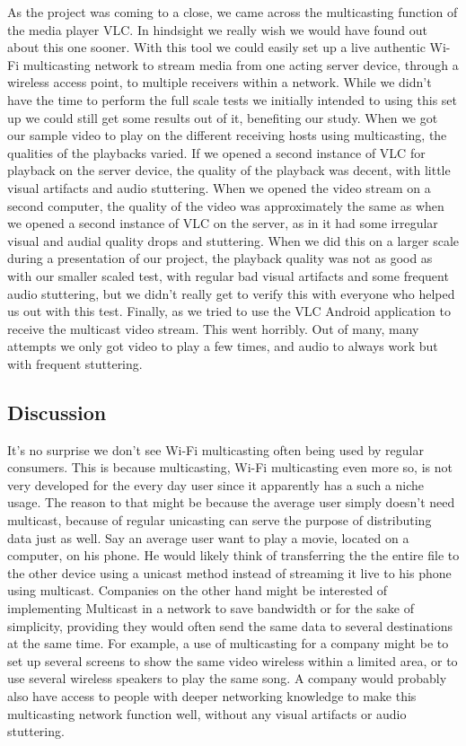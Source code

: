 \documentclass[9pt,a4paper]{acmproc}
\begin{document}
As the project was coming to a close, we came across the multicasting function of the media player VLC. In hindsight we really wish we would have found out about this one sooner. With this tool we could easily set up a live authentic Wi-Fi multicasting network to stream media from one acting server device, through a wireless access point, to multiple receivers within a network. While we didn't have the time to perform the full scale tests we initially intended to using this set up we could still get some results out of it, benefiting our study.
When we got our sample video to play on the different receiving hosts using multicasting, the qualities of the playbacks varied. If we opened a second instance of VLC for playback on the server device, the quality of the playback was decent, with little visual artifacts and audio stuttering. When we opened the video stream on a second computer, the quality of the video was approximately the same as when we opened a second instance of VLC on the server, as in it had some irregular visual and audial quality drops and stuttering. When we did this on a larger scale during a presentation of our project, the playback quality was not as good as with our smaller scaled test, with regular bad visual artifacts and some frequent audio stuttering, but we didn't really get to verify this with everyone who helped us out with this test. Finally, as we tried to use the VLC Android application to receive the multicast video stream. This went horribly. Out of many, many attempts we only got video to play a few times, and audio to always work but with frequent stuttering.

\subsection{Discussion}
It's no surprise we don't see Wi-Fi multicasting often being used by regular consumers. This is because multicasting, Wi-Fi multicasting even more so, is not very developed for the every day user since it apparently has a such a niche usage. The reason to that might be because the average user simply doesn't need multicast, because of regular unicasting can serve the purpose of distributing data just as well. Say an average user want to play a movie, located on a computer, on his phone. He would likely think of transferring the the entire file to the other device using a unicast method instead of streaming it live to his phone using multicast.
Companies on the other hand might be interested of implementing Multicast in a network to save bandwidth or for the sake of simplicity, providing they would often send the same data to several destinations at the same time. For example, a use of multicasting for a company might be to set up several screens to show the same video wireless within a limited area, or to use several wireless speakers to play the same song. A company would probably also have access to people with deeper networking knowledge to make this multicasting network function well, without any visual artifacts or audio stuttering.
\end{document}
